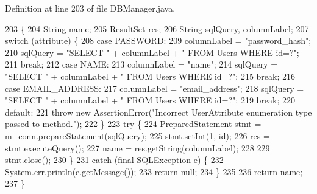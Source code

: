 Definition at line 203 of file D\+B\+Manager.\+java.


\begin{DoxyCode}
203                                                                                       \{
204         String name;
205         ResultSet res;
206         String sqlQuery, columnLabel;
207         \textcolor{keywordflow}{switch} (attribute) \{
208             \textcolor{keywordflow}{case} PASSWORD:
209                 columnLabel = \textcolor{stringliteral}{"password\_hash"};
210                 sqlQuery = \textcolor{stringliteral}{"SELECT "} + columnLabel + \textcolor{stringliteral}{" FROM Users WHERE id=?"};
211                 \textcolor{keywordflow}{break};
212             \textcolor{keywordflow}{case} NAME:
213                 columnLabel = \textcolor{stringliteral}{"name"};
214                 sqlQuery = \textcolor{stringliteral}{"SELECT "} + columnLabel + \textcolor{stringliteral}{" FROM Users WHERE id=?"};
215                 \textcolor{keywordflow}{break};
216             \textcolor{keywordflow}{case} EMAIL\_ADDRESS:
217                 columnLabel = \textcolor{stringliteral}{"email\_address"};
218                 sqlQuery = \textcolor{stringliteral}{"SELECT "} + columnLabel + \textcolor{stringliteral}{" FROM Users WHERE id=?"};
219                 \textcolor{keywordflow}{break};
220             \textcolor{keywordflow}{default}:
221                 \textcolor{keywordflow}{throw} \textcolor{keyword}{new} AssertionError(\textcolor{stringliteral}{"Incorrect UserAttribute enumeration type passed to method."});
222         \}
223         \textcolor{keywordflow}{try} \{
224             PreparedStatement stmt = \hyperlink{classcom_1_1activitytracker_1_1_d_b_manager_a064088d13ac09eb147fdc19268771521}{m\_conn}.prepareStatement(sqlQuery);
225             stmt.setInt(1, \textcolor{keywordtype}{id});
226             res = stmt.executeQuery();
227             name = res.getString(columnLabel);
228 
229             stmt.close();
230         \}
231         \textcolor{keywordflow}{catch} (\textcolor{keyword}{final} SQLException e) \{
232             System.err.println(e.getMessage());
233             \textcolor{keywordflow}{return} null;
234         \}
235 
236         \textcolor{keywordflow}{return} name;
237     \}
\end{DoxyCode}
